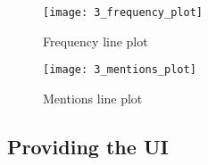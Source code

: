 \begin{figure}[!ht]
\centering
\texttt{[image: 3\_frequency\_plot]}
\caption{Frequency line plot}\label{frequency_plot}
\end{figure}

\begin{figure}[!ht]
\centering
\texttt{[image: 3\_mentions\_plot]}
\caption{Mentions line plot}\label{mentions_plot}
\end{figure}
\subsection{Providing the UI}

\clearpage